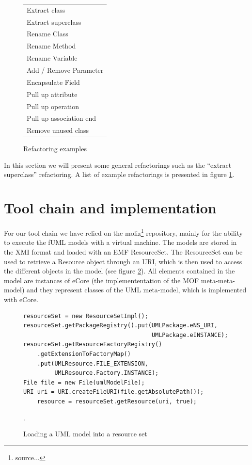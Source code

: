 \documentclass{llncs}
\begin{document}
\begin{figure}[h!t]
 \centering
 \begin{tabular}[]{l}
  \hline
  Extract class\\
  Extract superclass\\
  Rename Class\\
  Rename Method\\
  Rename Variable\\
  Add / Remove Parameter\\
  Encapsulate Field\\
  Pull up attribute\\
  Pull up operation\\
  Pull up association end\\
  Remove unused class\\
  \hline
 \end{tabular}
 \caption{Refactoring examples}
 \label{fig:refactoringlist}
\end{figure}

In this section we will present some general refactorings such as the ``extract superclass'' refactoring. A list of example refactorings
is presented in figure \ref{fig:refactoringlist}.

\section{Tool chain and implementation}
For our tool chain we have relied on the moliz\footnote{source...} repository, mainly for the ability to execute the fUML 
models with a virtual machine. The models are stored in the XMI format and loaded with an EMF ResourceSet. The ResourceSet
can be used to retrieve a Resource object through an URI, which is then used to access the different objects in the model 
(see figure \ref{lst:resourceset}). All elements contained in the model are instances of eCore (the implemententation of 
the MOF meta-meta-model) and they represent classes of the UML meta-model, which is implemented with eCore.

\begin{figure}
 \begin{lstlisting}
resourceSet = new ResourceSetImpl();
resourceSet.getPackageRegistry().put(UMLPackage.eNS_URI,
                                     UMLPackage.eINSTANCE);
resourceSet.getResourceFactoryRegistry()
    .getExtensionToFactoryMap()
    .put(UMLResource.FILE_EXTENSION,
         UMLResource.Factory.INSTANCE);
File file = new File(umlModelFile);
URI uri = URI.createFileURI(file.getAbsolutePath());
    resource = resourceSet.getResource(uri, true);
 \end{lstlisting}
 \caption{Loading a UML model into a resource set}.
 \label{lst:resourceset}
\end{figure}
\end{document}
